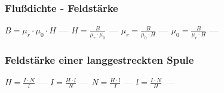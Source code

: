 \subsubsection{Flußdichte - Feldstärke} 
\begin{minipage}{0.45\textwidth} 
\end{minipage} 
\begin{minipage}{0.45\textwidth} 
 
\end{minipage} 
$ B = \mu _{r} \cdot \mu _{0} \cdot H $ \textcolor{lightgray}{\textbf{---}} 
$ H =\frac{ B}{\mu _{r} \cdot \mu _{0} } $ \textcolor{lightgray}{\textbf{---}} 
$ \mu _{r} =\frac{ B}{\mu _{0} \cdot H} $ \textcolor{lightgray}{\textbf{---}} 
$ \mu _{0} =\frac{ B}{\mu _{r} \cdot H} $ \textcolor{lightgray}{\textbf{---}} 

\subsubsection{Feldstärke einer langgestreckten Spule} 
\begin{minipage}{0.45\textwidth} 
\end{minipage} 
\begin{minipage}{0.45\textwidth} 
 
\end{minipage} 
$ H = \frac{I\cdot N}{ l} $ \textcolor{lightgray}{\textbf{---}} 
$ I = \frac{H\cdot l}{ N} $ \textcolor{lightgray}{\textbf{---}} 
$ N = \frac{H\cdot l}{ I} $ \textcolor{lightgray}{\textbf{---}} 
$ l = \frac{I\cdot N}{ H} $ \textcolor{lightgray}{\textbf{---}} 

